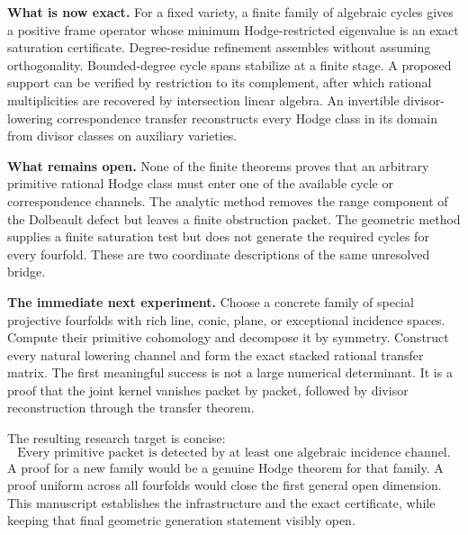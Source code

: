 \documentclass[11pt,oneside]{book}
\theoremstyle{definition}
\theoremstyle{remark}
\begin{document}
\textbf{What is now exact.} For a fixed variety, a finite family of algebraic cycles gives a positive frame operator whose minimum Hodge-restricted eigenvalue is an exact saturation certificate. Degree-residue refinement assembles without assuming orthogonality. Bounded-degree cycle spans stabilize at a finite stage. A proposed support can be verified by restriction to its complement, after which rational multiplicities are recovered by intersection linear algebra. An invertible divisor-lowering correspondence transfer reconstructs every Hodge class in its domain from divisor classes on auxiliary varieties.

\textbf{What remains open.} None of the finite theorems proves that an arbitrary primitive rational Hodge class must enter one of the available cycle or correspondence channels. The analytic method removes the range component of the Dolbeault defect but leaves a finite obstruction packet. The geometric method supplies a finite saturation test but does not generate the required cycles for every fourfold. These are two coordinate descriptions of the same unresolved bridge.

\textbf{The immediate next experiment.} Choose a concrete family of special projective fourfolds with rich line, conic, plane, or exceptional incidence spaces. Compute their primitive cohomology and decompose it by symmetry. Construct every natural lowering channel and form the exact stacked rational transfer matrix. The first meaningful success is not a large numerical determinant. It is a proof that the joint kernel vanishes packet by packet, followed by divisor reconstruction through the transfer theorem.

The resulting research target is concise:
\[
\boxed{\text{Every primitive packet is detected by at least one algebraic incidence channel.}}
\]
A proof for a new family would be a genuine Hodge theorem for that family. A proof uniform across all fourfolds would close the first general open dimension. This manuscript establishes the infrastructure and the exact certificate, while keeping that final geometric generation statement visibly open.
\end{document}
